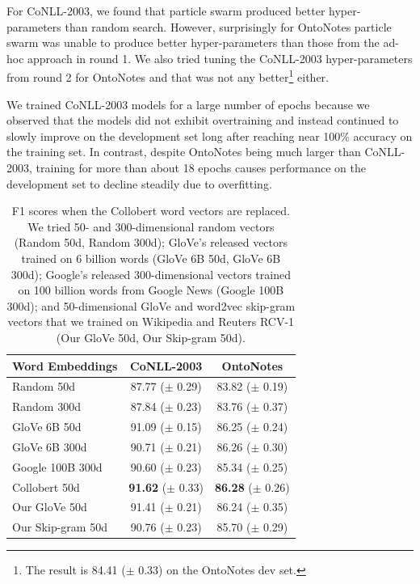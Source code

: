 \documentclass[11pt,letterpaper]{article}
\begin{document}
For CoNLL-2003, we found that particle swarm produced better hyper-parameters than random search. However, surprisingly for OntoNotes particle swarm was unable to produce better hyper-parameters than those from the ad-hoc approach in round 1. We also tried tuning the CoNLL-2003 hyper-parameters from round 2 for OntoNotes and that was not any better\footnote{The result is 84.41 ($\pm$ 0.33) on the OntoNotes dev set.} either.

We trained CoNLL-2003 models for a large number of epochs because we observed that the models did not exhibit overtraining and instead continued to slowly improve on the development set long after reaching near 100\% accuracy on the training set. In contrast, despite OntoNotes being much larger than CoNLL-2003, training for more than about 18 epochs causes performance on the development set to decline steadily due to overfitting.%

\begin{table}[t!]
\begin{center}
\small
\begin{tabular}{|l|c|c|}
\hline \bf Word Embeddings & \bf CoNLL-2003 & \bf OntoNotes \\ \hline
Random 50d       & 87.77 ($\pm$ 0.29) & 83.82 ($\pm$ 0.19) \\
Random 300d      & 87.84 ($\pm$ 0.23) & 83.76 ($\pm$ 0.37) \\
GloVe 6B 50d     & 91.09 ($\pm$ 0.15) & 86.25 ($\pm$ 0.24) \\
GloVe 6B 300d    & 90.71 ($\pm$ 0.21) & 86.26 ($\pm$ 0.30) \\
Google 100B 300d & 90.60 ($\pm$ 0.23) & 85.34 ($\pm$ 0.25) \\ \hline
Collobert 50d    & {\bf 91.62} ($\pm$ 0.33) & {\bf 86.28} ($\pm$ 0.26) \\
Our GloVe 50d    & 91.41 ($\pm$ 0.21) & 86.24 ($\pm$ 0.35) \\
Our Skip-gram 50d & 90.76 ($\pm$ 0.23) & 85.70 ($\pm$ 0.29) \\
\hline
\end{tabular}
\end{center}
\caption{
F1 scores when the Collobert word vectors are replaced. We tried 50- and 300-dimensional random vectors (Random 50d, Random 300d); GloVe's released vectors trained on 6 billion words (GloVe 6B 50d, GloVe 6B 300d); Google's released 300-dimensional vectors trained on 100 billion words from Google News (Google 100B 300d); and 50-dimensional GloVe and word2vec skip-gram vectors that we trained on Wikipedia and Reuters RCV-1 (Our GloVe 50d, Our Skip-gram 50d).
}
\label{tab:wordvec-res}
\end{table}
\end{document}
